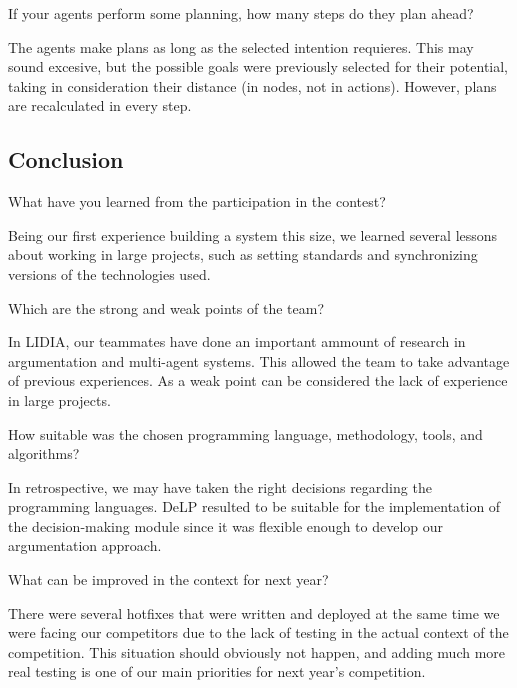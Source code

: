 \begin{question}
If your agents perform some planning, how many steps do they plan ahead?
\end{question}

The agents make plans as long as the selected intention requieres. This may
sound excesive, but the possible goals were previously selected for their
potential, taking in consideration their distance (in nodes, not in actions).
However, plans are recalculated in every step.

\subsection{Conclusion}
\setcounter{question}{0}

\begin{question}
What have you learned from the participation in the contest?
\end{question}

Being our first experience building a system this size, we learned several
lessons about working in large projects, such as setting standards and
synchronizing versions of the technologies used.

\begin{question}
Which are the strong and weak points of the team?
\end{question}

In LIDIA, our teammates have done an important ammount of research in argumentation
and multi-agent systems. This allowed the team to take advantage of previous experiences. 
As a weak point can be considered the lack of experience in large projects.

\begin{question}  
How suitable was the chosen programming language, methodology, tools, and
algorithms?
\end{question}

In retrospective, we may have taken the right decisions regarding the programming languages. 
DeLP resulted to be suitable for the implementation of the decision-making module since
it was flexible enough to develop our argumentation approach.


\begin{question}
What can be improved in the context for next year?
\end{question}

There were several hotfixes that were written and deployed at the same time we
were facing our competitors due to the lack of testing in the actual context of
the competition. This situation should obviously not happen, and adding much
more real testing is one of our main priorities for next year's competition.

